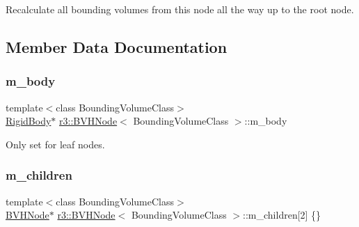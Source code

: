 Recalculate all bounding volumes from this node all the way up to the root node. 



\subsection{Member Data Documentation}
\mbox{\label{classr3_1_1_b_v_h_node_a7f1a7f51f17ed00cc39298ff4d1f1d57}} 
\subsubsection{\texorpdfstring{m\+\_\+body}{m\_body}}
{\footnotesize\ttfamily template$<$class Bounding\+Volume\+Class$>$ \\
\mbox{\hyperlink{classr3_1_1_rigid_body}{Rigid\+Body}}$\ast$ \mbox{\hyperlink{classr3_1_1_b_v_h_node}{r3\+::\+B\+V\+H\+Node}}$<$ Bounding\+Volume\+Class $>$\+::m\+\_\+body\hspace{0.3cm}{\ttfamily [protected]}}



Only set for leaf nodes. 

\mbox{\label{classr3_1_1_b_v_h_node_ac3df92e9a175e4037a07801e1cca73db}} 
\subsubsection{\texorpdfstring{m\+\_\+children}{m\_children}}
{\footnotesize\ttfamily template$<$class Bounding\+Volume\+Class$>$ \\
\mbox{\hyperlink{classr3_1_1_b_v_h_node}{B\+V\+H\+Node}}$\ast$ \mbox{\hyperlink{classr3_1_1_b_v_h_node}{r3\+::\+B\+V\+H\+Node}}$<$ Bounding\+Volume\+Class $>$\+::m\+\_\+children\mbox{[}2\mbox{]} \{\}\hspace{0.3cm}{\ttfamily [protected]}}

\mbox{\label{classr3_1_1_b_v_h_node_a62424473dd79cf59262a6a53995b0e26}} 
